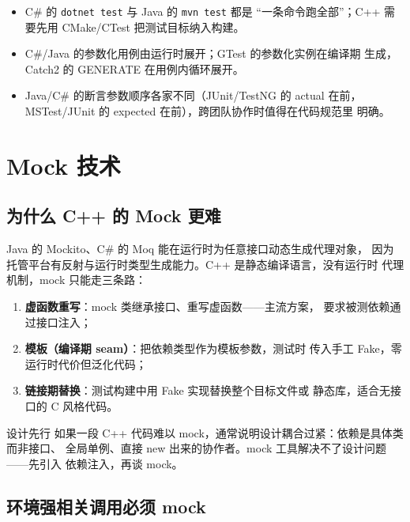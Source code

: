 \documentclass[12pt,a4paper,fontset=fandol]{ctexbook}
\begin{document}
\begin{itemize}
  \item C\# 的 \texttt{dotnet test} 与 Java 的 \texttt{mvn test} 都是
        “一条命令跑全部”；C++ 需要先用 CMake/CTest 把测试目标纳入构建。
  \item C\#/Java 的参数化用例由运行时展开；GTest 的参数化实例在编译期
        生成，Catch2 的 GENERATE 在用例内循环展开。
  \item Java/C\# 的断言参数顺序各家不同（JUnit/TestNG 的 actual 在前，
        MSTest/JUnit 的 expected 在前），跨团队协作时值得在代码规范里
        明确。
\end{itemize}

\chapter{Mock 技术}

\section{为什么 C++ 的 Mock 更难}

Java 的 Mockito、C\# 的 Moq 能在运行时为任意接口动态生成代理对象，
因为托管平台有反射与运行时类型生成能力。C++ 是静态编译语言，没有运行时
代理机制，mock 只能走三条路：

\begin{enumerate}
  \item \textbf{虚函数重写}：mock 类继承接口、重写虚函数——主流方案，
        要求被测依赖通过接口注入；
  \item \textbf{模板（编译期 seam）}：把依赖类型作为模板参数，测试时
        传入手工 Fake，零运行时代价但泛化代码；
  \item \textbf{链接期替换}：测试构建中用 Fake 实现替换整个目标文件或
        静态库，适合无接口的 C 风格代码。
\end{enumerate}

\begin{warning}{设计先行}
如果一段 C++ 代码难以 mock，通常说明设计耦合过紧：依赖是具体类而非接口、
全局单例、直接 new 出来的协作者。mock 工具解决不了设计问题——先引入
依赖注入，再谈 mock。
\end{warning}

\section{环境强相关调用必须 mock}
\end{document}
